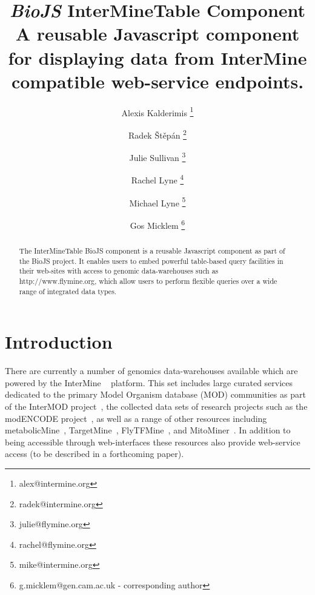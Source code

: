 \documentclass[10pt,a4paper,twocolumn]{article}
\begin{document}
\title{\textit{BioJS} InterMineTable Component \\
\small{A reusable Javascript component for displaying data from InterMine compatible web-service endpoints.}
}
\author[1]{Alexis Kalderimis \thanks{alex@intermine.org}}
\author[1]{Radek Štěpán \thanks{radek@intermine.org}}
\author[1]{Julie Sullivan \thanks{julie@flymine.org}}
\author[1]{Rachel Lyne \thanks{rachel@flymine.org}}
\author[1]{Michael Lyne \thanks{mike@intermine.org}}
\author[1]{Gos Micklem \thanks{g.micklem@gen.cam.ac.uk - corresponding author}}

\maketitle
\thispagestyle{fancy}

\begin{abstract}

The InterMineTable BioJS component is a reusable Javascript
component as part of the BioJS project. It enables users to embed
powerful table-based query facilities in their web-sites with
access to genomic data-warehouses such as http://www.flymine.org,
which allow users to perform flexible queries over a wide range
of integrated data types.

\end{abstract}
\clearpage

\section*{Introduction}

There are currently a number of genomics data-warehouses available which are
powered by the InterMine ~\cite{smith2012} platform. This set includes large
curated services dedicated to the primary Model Organism database (MOD)
communities as part of the InterMOD project~\cite{sullivan2013}, the collected
data sets of research projects such as the modENCODE
project~\cite{contrino2012}, as well as a range of other resources including
metabolicMine~\cite{metabolicmine}, TargetMine~\cite{targetmine},
FlyTFMine~\cite{flytfmine}, and MitoMiner~\cite{mitominer}.  In addition to
being accessible through web-interfaces these resources also provide web-service
access (to be described in a forthcoming paper).
\end{document}
